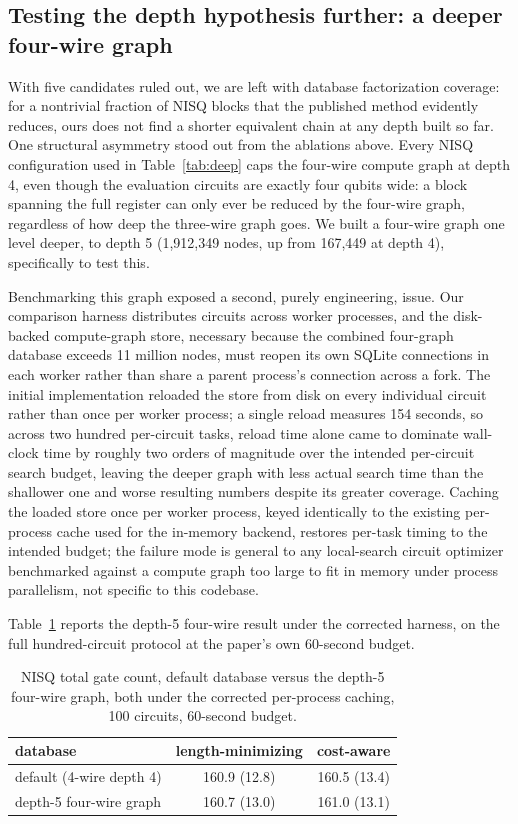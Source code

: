 \documentclass[11pt]{article}
\begin{document}
\subsection{Testing the depth hypothesis further: a deeper four-wire graph}
\label{sec:deep5}

With five candidates ruled out, we are left with database factorization
coverage: for a nontrivial fraction of NISQ blocks that the published
method evidently reduces, ours does not find a shorter equivalent chain at
any depth built so far. One structural asymmetry stood out from the
ablations above. Every NISQ configuration used in Table~\ref{tab:deep}
caps the four-wire compute graph at depth 4, even though the evaluation
circuits are exactly four qubits wide: a block spanning the full register
can only ever be reduced by the four-wire graph, regardless of how deep
the three-wire graph goes. We built a four-wire graph one level deeper, to
depth 5 (1,912,349 nodes, up from 167,449 at depth 4), specifically to
test this.

Benchmarking this graph exposed a second, purely engineering, issue.
Our comparison harness distributes circuits across worker processes, and
the disk-backed compute-graph store, necessary because the combined
four-graph database exceeds 11 million nodes, must reopen its own SQLite
connections in each worker rather than share a parent process's connection
across a fork. The initial implementation reloaded the store from disk on
every individual circuit rather than once per worker process; a single
reload measures 154 seconds, so across two hundred per-circuit tasks,
reload time alone came to dominate wall-clock time by roughly two orders
of magnitude over the intended per-circuit search budget, leaving the
deeper graph with less actual search time than the shallower one and
worse resulting numbers despite its greater coverage. Caching the loaded
store once per worker process, keyed identically to the existing
per-process cache used for the in-memory backend, restores per-task
timing to the intended budget; the failure mode is general to any
local-search circuit optimizer benchmarked against a compute graph too
large to fit in memory under process parallelism, not specific to this
codebase.

Table~\ref{tab:deep5} reports the depth-5 four-wire result under the
corrected harness, on the full hundred-circuit protocol at the paper's own
60-second budget.

\begin{table}[H]
\centering
\caption{NISQ total gate count, default database versus the depth-5
four-wire graph, both under the corrected per-process caching, 100
circuits, 60-second budget.}
\label{tab:deep5}
\begin{tabular}{lcc}
\toprule
database & length-minimizing & cost-aware \\
\midrule
default (4-wire depth 4)      & 160.9 (12.8) & 160.5 (13.4) \\
depth-5 four-wire graph       & 160.7 (13.0) & 161.0 (13.1) \\
\bottomrule
\end{tabular}
\end{table}
\end{document}
